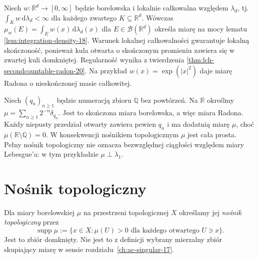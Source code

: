 \begin{przyklad}
Niech $w:\mathbb R^d\to[0,\infty]$ będzie borelowska
i lokalnie całkowalna względem $\lambda_d$,
tj. $\int_Kw\,\mathrm d\lambda_d<\infty$ dla każdego
zwartego $K\subseteq\mathbb R^d$. Wówczas
$\mu_w(E)=\int_Ew(x)\,\mathrm d\lambda_d(x)$
dla $E\in\mathcal B(\mathbb R^d)$ określa miarę na mocy
lematu \ref{lem:integration-density-18}. Warunek lokalnej
całkowalności gwarantuje lokalną skończoność, ponieważ
kula otwarta o skończonym promieniu zawiera się w zwartej
kuli domkniętej. Regularność wynika z twierdzenia
\ref{thm:lch-secondcountable-radon-20}. Na przykład $w(x)=\exp(|x|^2)$ daje miarę
Radona o nieskończonej masie całkowitej.
\end{przyklad}

\begin{przyklad}
Niech $(q_n)_{n\ge1}$ będzie numeracją zbioru
$\mathbb Q$ bez powtórzeń. Na $\mathbb R$ określmy
$\mu=\sum_{n\ge1}2^{-n}\delta_{q_n}$.
Jest to skończona miara borelowska, a więc miara Radona.
Każdy niepusty przedział otwarty zawiera pewien $q_n$
i ma dodatnią miarę $\mu$, choć $\mu(\mathbb R\setminus
\mathbb Q)=0$. W konsekwencji nośnikiem topologicznym
$\mu$ jest cała prosta. Pełny nośnik topologiczny
nie oznacza bezwzględnej ciągłości względem miary Lebesgue'a:
w tym przykładzie $\mu\perp\lambda_1$.
\end{przyklad}

\section{Nośnik topologiczny}
\begin{definicja}
\label{def:support-radon-20}
Dla miary borelowskiej $\mu$ na przestrzeni topologicznej
$X$ określamy jej \emph{nośnik topologiczny} przez
\[
\operatorname{supp}\mu
:=\{x\in X:\mu(U)>0\text{ dla każdego otwartego }
U\ni x\}.
\]
Jest to zbiór domknięty. Nie jest to z definicji
wybrany mierzalny zbiór skupiający miarę w sensie
rozdziału~\ref{ch:ac-singular-17}.
\end{definicja}

